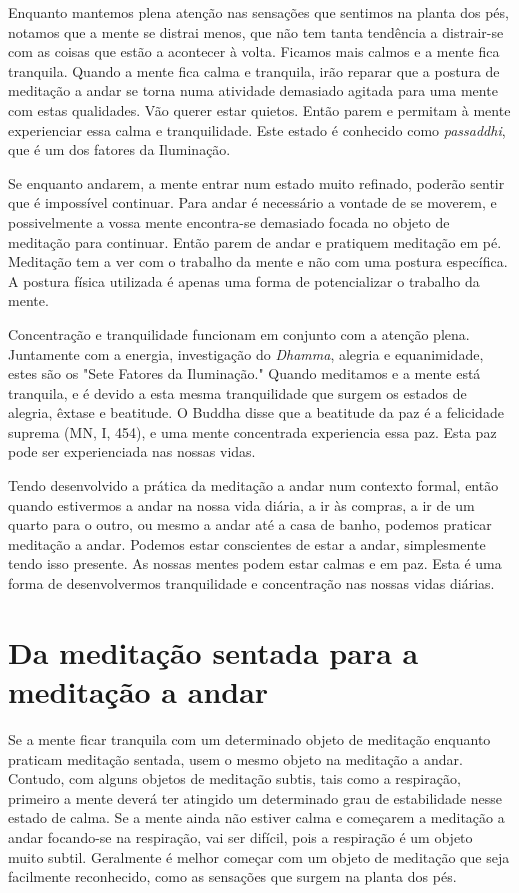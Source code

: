 Enquanto mantemos plena atenção nas sensações que sentimos na planta dos
pés, notamos que a mente se distrai menos, que não tem tanta tendência a
distrair-se com as coisas que estão a acontecer à volta. Ficamos mais
calmos e a mente fica tranquila. Quando a mente fica calma e tranquila,
irão reparar que a postura de meditação a andar se torna numa atividade
demasiado agitada para uma mente com estas qualidades. Vão querer estar
quietos. Então parem e permitam à mente experienciar essa calma e
tranquilidade. Este estado é conhecido como \emph{passaddhi}, que é um
dos fatores da Iluminação.

Se enquanto andarem, a mente entrar num estado muito refinado, poderão
sentir que é impossível continuar. Para andar é necessário a vontade de
se moverem, e possivelmente a vossa mente encontra-se demasiado focada
no objeto de meditação para continuar. Então parem de andar e pratiquem
meditação em pé. Meditação tem a ver com o trabalho da mente e não com
uma postura específica. A postura física utilizada é apenas uma forma de
potencializar o trabalho da mente.

Concentração e tranquilidade funcionam em conjunto com a atenção plena.
Juntamente com a energia, investigação do \emph{Dhamma}, alegria e
equanimidade, estes são os "Sete Fatores da Iluminação." Quando
meditamos e a mente está tranquila, e é devido a esta mesma
tranquilidade que surgem os estados de alegria, êxtase e beatitude. O
Buddha disse que a beatitude da paz é a felicidade suprema (MN, I, 454),
e uma mente concentrada experiencia essa paz. Esta paz pode ser
experienciada nas nossas vidas.

Tendo desenvolvido a prática da meditação a andar num contexto formal,
então quando estivermos a andar na nossa vida diária, a ir às compras, a
ir de um quarto para o outro, ou mesmo a andar até a casa de banho,
podemos praticar meditação a andar. Podemos estar conscientes de estar a
andar, simplesmente tendo isso presente. As nossas mentes podem estar
calmas e em paz. Esta é uma forma de desenvolvermos tranquilidade e
concentração nas nossas vidas diárias.

\section{Da meditação sentada para a meditação a andar}

Se a mente ficar tranquila com um determinado objeto de meditação
enquanto praticam meditação sentada, usem o mesmo objeto na meditação a
andar. Contudo, com alguns objetos de meditação subtis, tais como a
respiração, primeiro a mente deverá ter atingido um determinado grau de
estabilidade nesse estado de calma. Se a mente ainda não estiver calma e
começarem a meditação a andar focando-se na respiração, vai ser difícil,
pois a respiração é um objeto muito subtil. Geralmente é melhor começar
com um objeto de meditação que seja facilmente reconhecido, como as
sensações que surgem na planta dos pés.


